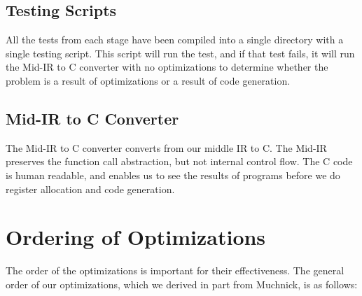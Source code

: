 \documentclass[11pt]{article}
\begin{document}
\subsection {Testing Scripts}

All the tests from each stage have been compiled into a single
directory with a single testing script. This script will run the test,
and if that test fails, it will run the Mid-IR to C converter with no
optimizations to determine whether the problem is a result of
optimizations or a result of code generation. 

\subsection {Mid-IR to C Converter} 

The Mid-IR to C converter converts from our middle IR to C. The Mid-IR
preserves the function call abstraction, but not internal control
flow. The C code is human readable, and enables us to see the results
of programs before we do register allocation and code generation.

\section {Ordering of Optimizations} 
\label{sec:order}

The order of the optimizations is important for their
effectiveness. The general order of our optimizations, which we derived
in part from Muchnick, is as follows: 
\end{document}
